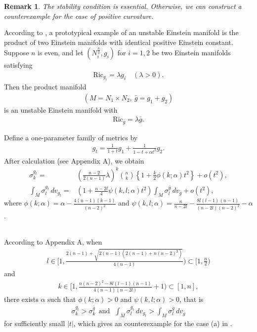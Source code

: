 \documentclass[12pt]{amsart}
\newtheorem{remark}{Remark}[section]
\newcommand{\bg}{\bar{g}}
\numberwithin{equation}{section}
\begin{document}
\begin{remark}
    The stability condition is essential. Otherwise, we can construct a counterexample for the case of positive curvature.
\end{remark}

According to \cite{Kroncke}, a prototypical example of an unstable Einstein manifold is the product of two Einstein manifolds with identical positive Einstein constant. Suppose \( n \) is even, and let \( (N^{\frac{n}{2}}_i, g_i) \) for \( i = 1, 2 \) be two Einstein manifolds satisfying
\begin{align*}
    \mathrm{Ric}_{g_i} = \lambda g_i \quad (\lambda > 0).
\end{align*}
Then the product manifold
\begin{align*}
    (M = N_1 \times N_2,\ \bg = g_1 + g_2)
\end{align*}
is an unstable Einstein manifold with
\begin{align*}
    \mathrm{Ric}_{\bg} = \lambda \bg.
\end{align*}

Define a one-parameter family of metrics by
\begin{align*}
g_t = \frac{1}{1+t} g_1 + \frac{1}{1 - t + \alpha t^2} g_2.
\end{align*}
After calculation (see Appendix A), we obtain
\begin{align*}
\sigma_k^{g_t} = &\left( \frac{n-2}{2(n-1)} \lambda \right)^k \binom{n}{k} \left\{ 1 + \frac{k}{2}\phi(k;\alpha)t^2 \right\}+ o(t^2),\\
\int_M \sigma_l^{g_t}\, dv_{g_t}=&\left( 1 + \frac{n-2l}{4}\psi(k,l;\alpha) t^2 \right)\int_M \sigma_l^{\bg}\, dv_{\bg}+ o(t^2),
\end{align*}
where $\phi(k;\alpha)=\alpha-\frac{4(n-1)(k-1)}{(n-2)^2}$ and $\psi(k,l;\alpha)=\frac{n}{n-2l}-\frac{8l(l-1)(n-1)}{(n-2l)(n-2)^2}-\alpha$. 

\ \\

According to Appendix A, when
\begin{align*}
    l\in[1,\frac{2(n-1)+\sqrt{2(n-1)\left(2(n-1)+n(n-2)^2\right)}}{4(n-1)})\subset[1,\frac{n}{2})
\end{align*}
and
\begin{align*}
    k\in[1,\frac{n(n-2)^2-8l(l-1)(n-1)}{4(n-1)(n-2l)}+1)\subset[1,n],
\end{align*}
there exists $\alpha$ such that $\phi(k;\alpha)>0$ and $\psi(k,l;\alpha)>0$, that is 
\begin{align*}
    \sigma_k^{g_t}>\sigma^{\bg}_k\ \ \text{and}\ \ \ \int_M \sigma_l^{g_t}\, dv_{g_t}>\int_M \sigma_l^{\bg}\, dv_{\bg}
\end{align*}
for sufficiently small $|t|$, which gives an counterexample for the case (a) in .
\end{document}
